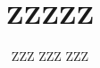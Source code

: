 \documentclass[spanish,letterpaper]{templates/uchile-tesis}
\title{ZZZZZ}
\author{ZZZ ZZZ ZZZ}
\begin{document}
\listoftodos
\newpage

\maketitle



 





\end{document}
